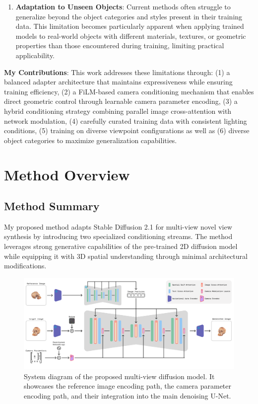 \begin{enumerate}
  \item \textbf{Adaptation to Unseen Objects}: Current methods often struggle to generalize beyond the object categories and styles present in their training data. This limitation becomes particularly apparent when applying trained models to real-world objects with different materials, textures, or geometric properties than those encountered during training, limiting practical applicability.

\end{enumerate}

\textbf{My Contributions}: This work addresses these limitations through: (1) a balanced adapter architecture that maintains expressiveness while ensuring training efficiency, (2) a FiLM-based camera conditioning mechanism that enables direct geometric control through learnable camera parameter encoding, (3) a hybrid conditioning strategy combining parallel image cross-attention with network modulation, (4) carefully curated training data with consistent lighting conditions, (5) training on diverse viewpoint configurations as well as (6) diverse object categories to maximize generalization capabilities.

\section{Method Overview}\label{sec:overview}

\subsection{Method Summary}
My proposed method adapts Stable Diffusion 2.1 for multi-view novel view synthesis by introducing two specialized conditioning streams. The method leverages strong generative capabilities of the pre-trained 2D diffusion model while equipping it with 3D spatial understanding through minimal architectural modifications.

\begin{figure}[htbp]
  \centering
  \includegraphics[width=\textwidth]{images/proposed-method/my-method-diagram.png}
  \caption{System diagram of the proposed multi-view diffusion model. It showcases the reference image encoding path, the camera parameter encoding path, and their integration into the main denoising U-Net.}
  \label{fig:my-method-diagram}
\end{figure}


